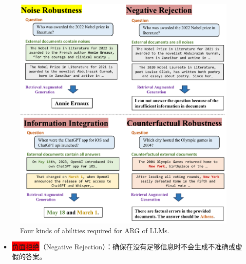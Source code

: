 \documentclass{beamer}
\begin{document}
\begin{frame}
    \begin{figure}[h]
        \centering
        \includegraphics[height=.74\textheight]{./images/figures/intro.pdf}
        \caption{Four kinds of abilities required for ARG of LLMs.}
    \end{figure}
    \begin{itemize}
        \item {\colorbox{red}{负面拒绝}（Negative Rejection）：确保在没有足够信息时不会生成不准确或虚假的答案。}
    \end{itemize}
\end{frame}
\end{document}
